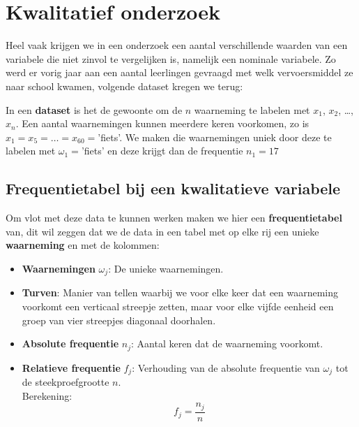 \documentclass[12pt,twoside,a4paper]{article}
\begin{document}
\cleardoublepage
\section{Kwalitatief onderzoek}

Heel vaak krijgen we in een onderzoek een aantal verschillende waarden van een variabele die niet zinvol te vergelijken is, namelijk een nominale variabele. Zo werd er vorig jaar aan een aantal leerlingen gevraagd met welk vervoersmiddel ze naar school kwamen, volgende dataset kregen we terug:

{ \small {}}

In een {\bf dataset} is het de gewoonte om de $n$ waarneming te labelen met $x_1$, $x_2$, \ldots, $x_n$. Een aantal waarnemingen kunnen meerdere keren voorkomen, zo is $x_1=x_5=\ldots=x_{60}=$'fiets'. We maken die waarnemingen uniek door deze te labelen met $\omega_1=$'fiets' en deze krijgt dan de frequentie $n_1=17$

\subsection{Frequentietabel bij een kwalitatieve variabele}

Om vlot met deze data te kunnen werken maken we hier een {\bf frequentietabel} van, dit wil zeggen dat we de data in een tabel met op elke rij een unieke {\bf waarneming} en met de kolommen:
\begin{itemize}
  \item {\bf Waarnemingen} $\omega_j$: De unieke waarnemingen.
  \item {\bf Turven}: Manier van tellen waarbij we voor elke keer dat een waarneming voorkomt een verticaal streepje zetten, maar voor elke vijfde eenheid een groep van vier streepjes diagonaal doorhalen.
  \item {\bf Absolute frequentie} $n_j$: Aantal keren dat de waarneming voorkomt.
  \item {\bf Relatieve frequentie} $f_j$: Verhouding van de absolute frequentie van $\omega_j$ tot de steekproefgrootte $n$.\\
  Berekening: $$f_j=\dfrac{n_j}{n}$$
\end{itemize}
\end{document}
